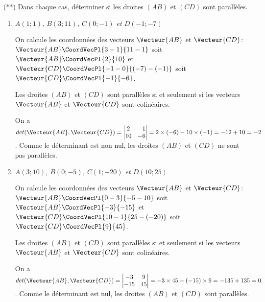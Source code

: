 \documentclass[a4paper]{article}
\begin{document}
  \begin{exercice}{(**)}{}
    Dans chaque cas, déterminer si les droites $(AB)$ et $(CD)$ sont parallèles.
    \begin{enumerate}
      \item \textit{$A(1;1)$, $B(3;11)$, $C(0;-1)$ et $D(-1;-7)$}
      
      On calcule les coordonnées des vecteurs $\Vecteur{AB}$ et $\Vecteur{CD}$: $\Vecteur{AB}\CoordVecPl{3-1}{11-1}$ soit $\Vecteur{AB}\CoordVecPl{2}{10}$ et $\Vecteur{CD}\CoordVecPl{-1-0}{(-7)-(-1)}$ soit $\Vecteur{CD}\CoordVecPl{-1}{-6}$.

      Les droites $(AB)$ et $(CD)$ sont parallèles si et seulement si les vecteurs $\Vecteur{AB}$ et $\Vecteur{CD}$ sont colinéaires.

      On a $det(\Vecteur{AB}, \Vecteur{CD})=\begin{vmatrix}
        2 & -1\\
        10 & -6
      \end{vmatrix}=2\times(-6)-10\times(-1)=-12+10=-2$. Comme le déterminant est non nul, les droites $(AB)$ et $(CD)$ ne sont pas parallèles.


      
      \item \textit{$A(3;10)$, $B(0;-5)$, $C(1;-20)$ et $D(10;25)$}
      
      On calcule les coordonnées des vecteurs $\Vecteur{AB}$ et $\Vecteur{CD}$: $\Vecteur{AB}\CoordVecPl{0-3}{-5-10}$ soit $\Vecteur{AB}\CoordVecPl{-3}{-15}$ et $\Vecteur{CD}\CoordVecPl{10-1}{25-(-20)}$ soit $\Vecteur{CD}\CoordVecPl{9}{45}$.

      Les droites $(AB)$ et $(CD)$ sont parallèles si et seulement si les vecteurs $\Vecteur{AB}$ et $\Vecteur{CD}$ sont colinéaires.

      On a $det(\Vecteur{AB}, \Vecteur{CD})=\begin{vmatrix}
        -3 & 9\\
        -15 & 45
      \end{vmatrix}=-3\times 45-(-15)\times 9=-135+135=0$. Comme le déterminant est nul, les droites $(AB)$ et $(CD)$ sont parallèles.

    \end{enumerate}
    \end{exercice}
\end{document}
